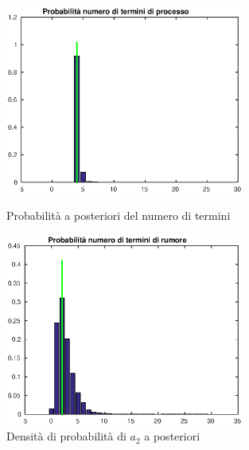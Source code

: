 \documentclass[10pt,a4paper,oneside,openany,noindent]{report}
\begin{document}
\begin{figure}[ht]
\quad
\centering
\begin{minipage}[b]{0.45\linewidth}
\centering
\includegraphics[width=0.7\textwidth]{histk.eps} 
\caption{Probabilità a posteriori del numero di termini }
\label{fig:minipage1}
\end{minipage}
\quad
\begin{minipage}[b]{0.45\linewidth}
\centering
\includegraphics[width=0.7\textwidth]{histq.eps}
\caption{Densità di probabilità di $a_2$ a posteriori}
\label{fig:minipage2}
\end{minipage}
\end{figure}
\end{document}

